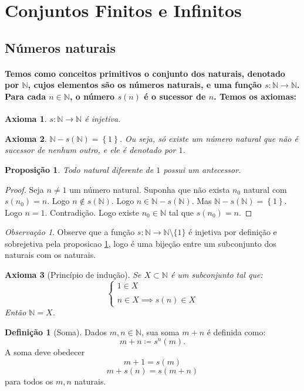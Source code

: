 \documentclass{article}
\theoremstyle{plain}
\newtheorem{axioma}{Axioma}
\newtheorem{prop}{Proposição}[section]
\theoremstyle{definition}
\newtheorem{definicao}{Definição}[section]
\theoremstyle{remark}
\newtheorem{obs}{Observação}[section]
\begin{document}
\section{Conjuntos Finitos e Infinitos}
\subsection{Números naturais}
\paragraph{Temos como conceitos primitivos o conjunto dos naturais, denotado por $\mathbb{N}$, cujos elementos são os números naturais, e uma função $s:\mathbb{N} \to \mathbb{N}$. Para cada $n\in \mathbb{N}$, o número $s(n)$ é o sucessor de $n$.  Temos os axiomas:}
\begin{axioma}
	$s:\mathbb{N} \to \mathbb{N}$ é injetiva.
\end{axioma}
\begin{axioma}
	$\mathbb{N} - s(\mathbb{N}) = \left\{ 1 \right\}$. Ou seja, só existe um número natural que não é sucessor de nenhum outro, e ele é denotado por $1$.
\end{axioma}
\begin{prop}
	\label{propsuc}
	Todo natural diferente de $1$ possui um antecessor.
\end{prop}
\begin{proof}
	Seja $n\neq 1$ um número natural. Suponha que não exista $n_0$ natural com $s(n_0) = n$. Logo $n \not \in s\left(\mathbb{N}\right)$. Logo $n\in \mathbb{N} - s(\mathbb{N})$. Mas $\mathbb{N} - s(\mathbb{N}) = \left\{ 1 \right\}$. Logo $n = 1$. Contradição. Logo existe  $n_0\in \mathbb{N}$ tal que $s(n_0) = n$.
\end{proof}
\begin{obs}
	Observe que a função $s: \mathbb{N} \to \mathbb{N}\setminus \{1\}$ é injetiva por definição e sobrejetiva pela proposicao \ref{propsuc}, logo é uma bijeção entre um subconjunto dos naturais com os naturais.
\end{obs}
\begin{axioma}[Princípio de indução]
	Se $X\subset \mathbb{N}$ é  um subconjunto tal que: 
	$$
	\begin{cases}
		1 \in X\\~\\
		n \in X \implies s(n) \in X
	\end{cases}
	$$
	Então $\mathbb{N} = X$.
\end{axioma}
\begin{definicao}[Soma]
	Dados $m,n\in \mathbb{N}$, sua soma $m+n$ é definida como:$$ m+n \coloneqq s^n(m).$$ A soma deve obedecer \begin{equation} m+1 = s(m)\end{equation} \begin{equation}m +s(n) = s(m+n)\end{equation}  para todos os $m,n$ naturais.
\end{definicao}
\end{document}
